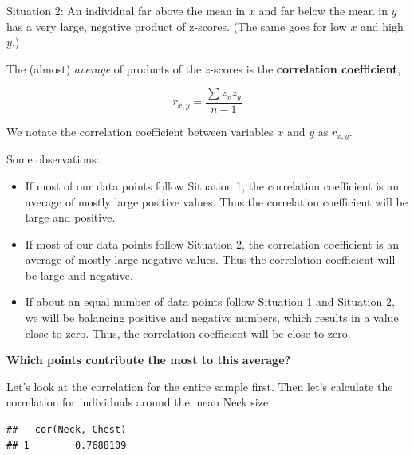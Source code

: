 \documentclass[
]{book}
\newenvironment{Shaded}{\begin{snugshade}}{\end{snugshade}}
\newcommand{\CommentTok}[1]{\textcolor[rgb]{0.56,0.35,0.01}{\textit{#1}}}
\newcommand{\DecValTok}[1]{\textcolor[rgb]{0.00,0.00,0.81}{#1}}
\newcommand{\KeywordTok}[1]{\textcolor[rgb]{0.13,0.29,0.53}{\textbf{#1}}}
\newcommand{\NormalTok}[1]{#1}
\newcommand{\OperatorTok}[1]{\textcolor[rgb]{0.81,0.36,0.00}{\textbf{#1}}}
\newcommand{\StringTok}[1]{\textcolor[rgb]{0.31,0.60,0.02}{#1}}
\providecommand{\tightlist}{%
  \setlength{\itemsep}{0pt}\setlength{\parskip}{0pt}}
\begin{document}
Situation 2: An individual far above the mean in \(x\) and far below the mean in \(y\) has a very large, negative product of z-scores. (The same goes for low \(x\) and high \(y\).)

The (almost) \emph{average} of products of the \(z\)-scores is the \textbf{correlation coefficient},

\[ r_{x,y} = \frac{\sum z_x z_y}{n-1} \]

We notate the correlation coefficient between variables \(x\) and \(y\) as \(r_{x,y}\).

Some observations:

\begin{itemize}
\tightlist
\item
  If most of our data points follow Situation 1, the correlation coefficient is an average of mostly large positive values. Thus the correlation coefficient will be large and positive.
\item
  If most of our data points follow Situation 2, the correlation coefficient is an average of mostly large negative values. Thus the correlation coefficient will be large and negative.
\item
  If about an equal number of data points follow Situation 1 and Situation 2, we will be balancing positive and negative numbers, which results in a value close to zero. Thus, the correlation coefficient will be close to zero.
\end{itemize}

\textbf{Which points contribute the most to this average?}

Let's look at the correlation for the entire sample first. Then let's calculate the correlation for individuals around the mean Neck size.

\begin{Shaded}
\end{Shaded}

\begin{verbatim}
##   cor(Neck, Chest)
## 1        0.7688109
\end{verbatim}

\begin{Shaded}
\end{Shaded}
\end{document}
